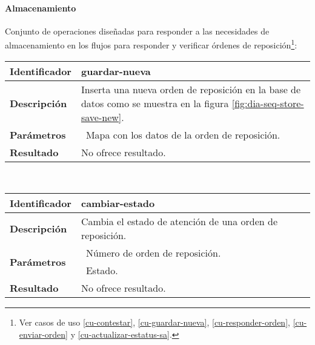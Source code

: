 \paragraph{Almacenamiento\\}
Conjunto de operaciones diseñadas para responder a las necesidades de almacenamiento en los flujos para responder y verificar órdenes de reposición\footnote{Ver casos de uso \ref{cu-contestar}, \ref{cu-guardar-nueva}, \ref{cu-responder-orden}, \ref{cu-enviar-orden} y \ref{cu-actualizar-estatus-sa}.}:
	\vspace{5mm}\\
	\begin{tabular}{|p{}|p{}|}
		\hline
		\textbf{Identificador}	& \textbf{guardar-nueva} \\
		\hline
		\hline
		\textbf{Descripción}	& Inserta una nueva orden de reposición en la base de datos como se muestra en la figura \ref{fig:dia-seq-store-save-new}.\\
		\hline
		\textbf{Parámetros} 	& \textbullet\, Mapa con los datos de la orden de reposición.\\
		\hline
		\textbf{Resultado}		& No ofrece resultado.\\
		\hline
	\end{tabular}
	\vspace{5mm}\\
	\iffalse
	\begin{figure}[h]
		\centering
		\texttt{[image: dia-seq-store-save-new]}
		\caption{Diagrama de secuencia de la operación guardar-nueva de la interfaz Almacenamiento.}
		\label{fig:dia-seq-store-save-new}
	\end{figure}
	\fi
	\begin{tabular}{|p{}|p{}|}
		\hline
		\textbf{Identificador}	& \textbf{cambiar-estado} \\
		\hline
		\hline
		\textbf{Descripción}	& Cambia el estado de atención de una orden de reposición. \\
		\hline
		\multirow{2}{*}{\textbf{Parámetros}}	& \textbullet\, Número de orden de reposición.\\
												& \textbullet\, Estado.\\
		\hline
		\textbf{Resultado}		& No ofrece resultado.\\
		\hline
	\end{tabular}
